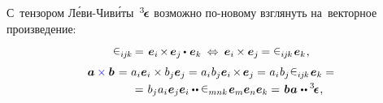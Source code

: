 \begin{otherlanguage}{russian}
С~тензором Л\'{е}ви\hbox{-\!}Чив\'{и}ты~${^3\hspace{-0.25ex}\bm{\epsilon}}\hspace{.05ex}$ возможно по\hbox{-}новому взглянуть на~векторное произведение:

\nopagebreak\vspace{-0.3em}\begin{equation*}
\levicivita_{i\hspace{-0.1ex}j\hspace{-0.1ex}k} \hspace{-0.15ex} = \hspace{.15ex}
\hspace{.1ex} \bm{e}_i \hspace{-0.2ex} \times \hspace{-0.2ex} \bm{e}_j \hspace{-0.1ex} \dotp \hspace{.12ex} \bm{e}_k
\:\Leftrightarrow\:
\bm{e}_i \hspace{-0.1ex} \times \bm{e}_j \hspace{-0.12ex}
= \levicivita_{i\hspace{-0.1ex}j\hspace{-0.1ex}k} \hspace{.2ex} \bm{e}_k
\hspace{.1ex} ,
\end{equation*}\vspace{-1.6em}
\begin{multline}
\bm{a} \mathcolor{blue}{\times} \bm{b} \hspace{.2ex}
= \hspace{.1ex} a_i \bm{e}_i \times b_j \bm{e}_j
= \hspace{.1ex} a_i \hspace{.1ex} b_j \bm{e}_i \hspace{-0.2ex} \times \hspace{-0.2ex} \bm{e}_j
= \hspace{.1ex} a_i \hspace{.1ex} b_j \hspace{.1ex} \levicivita_{i\hspace{-0.1ex}j\hspace{-0.1ex}k} \hspace{.2ex} \bm{e}_k =
\\[-0.12em]
\shoveright{= \hspace{.2ex} b_j \hspace{.1ex} a_i \hspace{.1ex} \bm{e}_j \bm{e}_i \dotdotp \levicivita_{mnk} \hspace{.2ex} \bm{e}_m \bm{e}_n \bm{e}_k
= \hspace{.2ex} \bm{b} \hspace{.1ex} \bm{a} \hspace{.1ex} \dotdotp \levicivitatensor \hspace{.1ex} ,}

\end{multline}
\end{otherlanguage}
